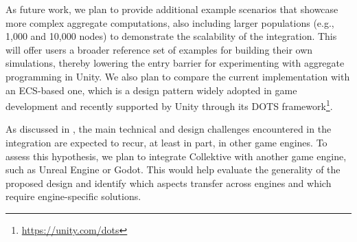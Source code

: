 As future work, 
we plan to provide additional example scenarios that showcase more complex aggregate computations,
also including larger populations (e.g., 1{,}000 and 10{,}000 nodes) to demonstrate the scalability of the integration.
%
This will offer users a broader reference set of examples for building their own simulations, 
thereby lowering the entry barrier for experimenting with aggregate programming in Unity.
%
We also plan to compare the current implementation with an \ac{ECS}-based one,
which is a design pattern widely adopted in game development and recently supported by Unity through its \ac{DOTS} framework\footnote{\url{https://unity.com/dots}}.

As discussed in ,
the main technical and design challenges encountered in the integration are expected to recur,
at least in part, in other game engines.
%
To assess this hypothesis,
we plan to integrate Collektive with another game engine, such as Unreal Engine or Godot.
%
This would help evaluate the generality of the proposed design and identify which aspects transfer across engines
and which require engine-specific solutions.
